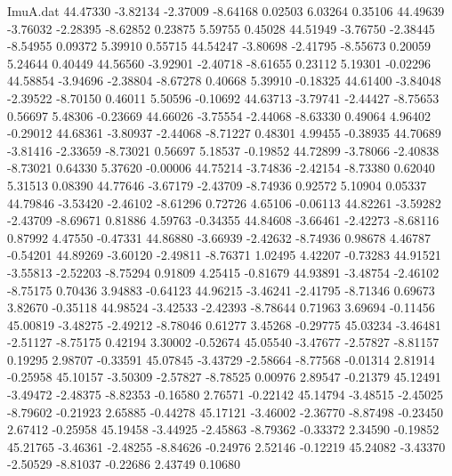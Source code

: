 \begin{filecontents}{ImuA.dat}
  44.47330   -3.82134   -2.37009   -8.64168    0.02503    6.03264    0.35106
  44.49639   -3.76032   -2.28395   -8.62852    0.23875    5.59755    0.45028
  44.51949   -3.76750   -2.38445   -8.54955    0.09372    5.39910    0.55715
  44.54247   -3.80698   -2.41795   -8.55673    0.20059    5.24644    0.40449
  44.56560   -3.92901   -2.40718   -8.61655    0.23112    5.19301   -0.02296
  44.58854   -3.94696   -2.38804   -8.67278    0.40668    5.39910   -0.18325
  44.61400   -3.84048   -2.39522   -8.70150    0.46011    5.50596   -0.10692
  44.63713   -3.79741   -2.44427   -8.75653    0.56697    5.48306   -0.23669
  44.66026   -3.75554   -2.44068   -8.63330    0.49064    4.96402   -0.29012
  44.68361   -3.80937   -2.44068   -8.71227    0.48301    4.99455   -0.38935
  44.70689   -3.81416   -2.33659   -8.73021    0.56697    5.18537   -0.19852
  44.72899   -3.78066   -2.40838   -8.73021    0.64330    5.37620   -0.00006
  44.75214   -3.74836   -2.42154   -8.73380    0.62040    5.31513    0.08390
  44.77646   -3.67179   -2.43709   -8.74936    0.92572    5.10904    0.05337
  44.79846   -3.53420   -2.46102   -8.61296    0.72726    4.65106   -0.06113
  44.82261   -3.59282   -2.43709   -8.69671    0.81886    4.59763   -0.34355
  44.84608   -3.66461   -2.42273   -8.68116    0.87992    4.47550   -0.47331
  44.86880   -3.66939   -2.42632   -8.74936    0.98678    4.46787   -0.54201
  44.89269   -3.60120   -2.49811   -8.76371    1.02495    4.42207   -0.73283
  44.91521   -3.55813   -2.52203   -8.75294    0.91809    4.25415   -0.81679
  44.93891   -3.48754   -2.46102   -8.75175    0.70436    3.94883   -0.64123
  44.96215   -3.46241   -2.41795   -8.71346    0.69673    3.82670   -0.35118
  44.98524   -3.42533   -2.42393   -8.78644    0.71963    3.69694   -0.11456
  45.00819   -3.48275   -2.49212   -8.78046    0.61277    3.45268   -0.29775
  45.03234   -3.46481   -2.51127   -8.75175    0.42194    3.30002   -0.52674
  45.05540   -3.47677   -2.57827   -8.81157    0.19295    2.98707   -0.33591
  45.07845   -3.43729   -2.58664   -8.77568   -0.01314    2.81914   -0.25958
  45.10157   -3.50309   -2.57827   -8.78525    0.00976    2.89547   -0.21379
  45.12491   -3.49472   -2.48375   -8.82353   -0.16580    2.76571   -0.22142
  45.14794   -3.48515   -2.45025   -8.79602   -0.21923    2.65885   -0.44278
  45.17121   -3.46002   -2.36770   -8.87498   -0.23450    2.67412   -0.25958
  45.19458   -3.44925   -2.45863   -8.79362   -0.33372    2.34590   -0.19852
  45.21765   -3.46361   -2.48255   -8.84626   -0.24976    2.52146   -0.12219
  45.24082   -3.43370   -2.50529   -8.81037   -0.22686    2.43749    0.10680

\end{filecontents}

